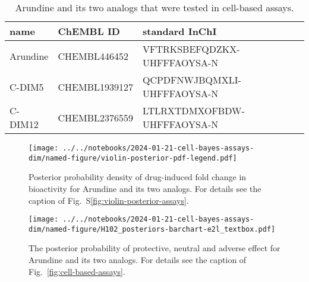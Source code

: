\documentclass[letterpaper]{article}
\begin{document}
\begin{table}[p]
\begin{tabular}{lll}
\toprule
name & ChEMBL ID & standard InChI \\
\midrule
Arundine & CHEMBL446452 & VFTRKSBEFQDZKX-UHFFFAOYSA-N \\
C-DIM5 & CHEMBL1939127 & QCPDFNWJBQMXLI-UHFFFAOYSA-N \\
C-DIM12 & CHEMBL2376559 & LTLRXTDMXOFBDW-UHFFFAOYSA-N \\
\bottomrule
\end{tabular}
\caption{
  Arundine and its two analogs that were tested in cell-based assays.
}
\label{tab:arundine-analogs}
\end{table}


\begin{figure}[p]
\texttt{[image: ../../notebooks/2024-01-21-cell-bayes-assays-dim/named-figure/violin-posterior-pdf-legend.pdf]}
\caption{Posterior probability density of drug-induced fold change in
  bioactivity for Arundine and its two analogs.  For details see
  the caption of Fig.~S\ref{fig:violin-posterior-assays}.
}
\label{fig:violin-posterior-assays-dim}
\end{figure}


\begin{figure}[p]
\texttt{[image: ../../notebooks/2024-01-21-cell-bayes-assays-dim/named-figure/H102\_posteriors-barchart-e2l\_textbox.pdf]}
\caption{The posterior probability of protective, neutral and adverse effect
  for Arundine and its two analogs.  For details see
  the caption of Fig.~\ref{fig:cell-based-assays}.
}
\label{fig:bar-posterior-assays-dim}
\end{figure}
\end{document}
